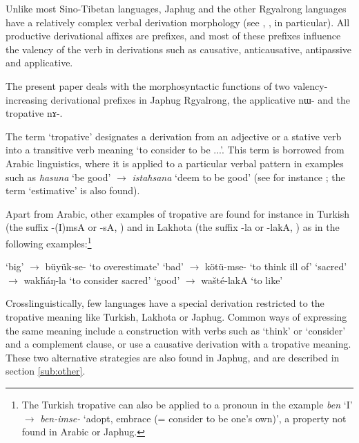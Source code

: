 \documentclass[oldfontcommands,twoside,a4paper,12pt]{article}
\newcommand{\ipa}[1]{{\phon \mbox{#1}}} %
\begin{document}
Unlike most Sino-Tibetan languages, Japhug and the other Rgyalrong languages have a relatively complex verbal derivation morphology (see  \citealt{jackson06paisheng}, \citealt{jacques08}, \citealt{jacques12demotion} in particular). All productive derivational affixes are prefixes, and most of these prefixes influence the valency of the verb  in derivations such as causative, anticausative, antipassive and applicative. 
 
The present paper deals with the morphosyntactic functions of two valency-increasing derivational prefixes in Japhug Rgyalrong, the applicative  \ipa{nɯ-} and the tropative \ipa{nɤ-}. 

  The term `tropative' designates a derivation from an adjective or a stative  verb into a transitive verb meaning `to consider to be ...'. This term  is borrowed from Arabic linguistics, where it is applied to a particular verbal pattern  in examples such as \textit{ħasuna} `be good' $\rightarrow$  \textit{istaħsana} `deem to be good'     (see for instance \citealt{larcher96}; the term `estimative' is also found).

   Apart from  Arabic, other examples of tropative are found for instance in Turkish (the suffix  \ipa{-(I)msA} or \ipa{-sA}, \citealt[56]{goksel05grammar}) and in Lakhota (the suffix \ipa{-la} or \ipa{-lakA}, \citealt[317]{ullrich08}) as in the following examples:\footnote{The Turkish tropative can also be   applied to a pronoun in the example \textit{ben} `I' $\rightarrow$  \textit{ben-imse-} `adopt, embrace (= consider to be one's own)', a property not found in Arabic or Japhug. 
   }
   
        \begin{exe}
\ex 
 \glt   \ipa{büyük} `big' $\rightarrow$  \ipa{büyük-se-} `to overestimate'
 \glt \ipa{kötü } `bad' $\rightarrow$  \ipa{kötü-mse-} `to think ill of'
 \ex \label{ex:wakhaN}
    \glt   \ipa{wakȟáŋ} `sacred' $\rightarrow$  \ipa{wakȟáŋ-la} `to consider sacred'
 \glt \ipa{wašté} `good' $\rightarrow$  \ipa{wašté-lakA} `to like'
   \end{exe}
   
   \lhead[]{\thepage}
\rhead[\thepage]{}
\lfoot[]{}
\cfoot[]{}
\rfoot[]{}
   Crosslinguistically, few languages   have a special derivation  restricted to the tropative meaning like Turkish, Lakhota or Japhug. Common ways of expressing the same meaning include a construction with verbs such as `think' or `consider' and a complement clause, or use a causative  derivation with a tropative meaning. These two alternative strategies are also found in Japhug, and are described in section \ref{sub:other}.
    
\end{document}
